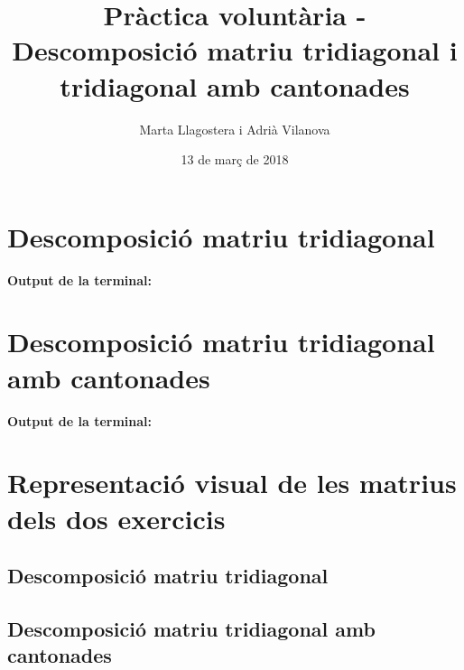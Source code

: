 \documentclass[11pt,a4paper]{article}
\author{Marta Llagostera i Adrià Vilanova\vspace{-2ex} }
\title{Pràctica voluntària - Descomposició matriu tridiagonal i tridiagonal amb cantonades\vspace{-2ex}}
\date{13 de març de 2018}
\begin{document}
\maketitle

\section{Descomposició matriu tridiagonal}

\textbf{Output de la terminal:}



\section{Descomposició matriu tridiagonal amb cantonades}

\textbf{Output de la terminal:}



\pagebreak

\section{Representació visual de les matrius dels dos exercicis}

\subsection{Descomposició matriu tridiagonal}



\subsection{Descomposició matriu tridiagonal amb cantonades}


\end{document}
